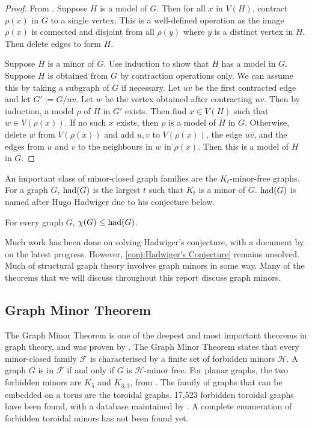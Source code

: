 \begin{proof}
	From \textcite{norinMath599GraphMinors2017}. Suppose \(H\) is a model of \(G\). Then for all \(x\) in \(V(H)\), contract \(\rho(x)\) in \(G\) to a single vertex. This is a well-defined operation as the image $\rho(x)$ is connected and disjoint from all $\rho(y)$ where $y$ is a distinct vertex in $H$. Then delete edges to form \(H\).

	Suppose $H$ is a minor of $G$. Use induction to show that \(H\) has a model in \(G\). Suppose \(H\) is obtained from \(G\) by contraction operations only. We can assume this by taking a subgraph of \(G\) if necessary. Let \(uv\) be the first contracted edge and let \(G' := G / uv\). Let \(w\) be the vertex obtained after contracting \(uv\). Then by induction, a model \(\rho\) of \(H\) in \(G'\) exists. Then find $x \in V(H)$ such that $w \in V(\rho(x))$. If no such $x$ exists, then $\rho$ is a model of $H$ in $G$. Otherwise, delete \(w\) from \(V(\rho(x)) \) and add $u, v$ to $V(\rho(x))$, the edge $uv$, and the edges from $u$ and $v$ to the neighbours in $w$ in $\rho(x)$. Then this is a model of \(H\) in \(G\). 
\end{proof}

An important class of minor-closed graph families are the \(K_t\)-minor-free graphs. For a graph \(G\), \(\operatorname{had}(G)\) is the largest \(t\) such that \(K_t\) is a minor of \(G\). $\operatorname{had}(G)$ is named after Hugo Hadwiger due to his conjecture below.
\begin{conjecture}\label{conj:Hadwiger's Conjecture}
	For every graph \(G\), \(\chi(G) \leq \operatorname{had}(G)\).
\end{conjecture}
Much work has been done on solving Hadwiger's conjecture, with a document by \textcite{seymourHadwigersConjecture2016} on the latest progress. However, \cref{conj:Hadwiger's Conjecture} remains unsolved. Much of structural graph theory involves graph minors in some way. Many of the theorems that we will discuss throughout this report discuss graph minors. 

 \subsection{Graph Minor Theorem}
The Graph Minor Theorem is one of the deepest and most important theorems in graph theory, and was proven by \textcite{robertsonGraphMinorsXX2004}. The Graph Minor Theorem states that every minor-closed family $\mathcal{F}$ is characterised by a finite set of forbidden minors $\mathcal{H}$. A graph $G$ is in $\mathcal{F}$ if and only if $G$ is $\mathcal{H}$-minor free.
For planar graphs, the two forbidden minors are \(K_5\) and \(K_{3,3}\), from \textcite{wagnerUeberEigenschaftEbenen1937}. 
The family of graphs that can be embedded on a torus are the toroidal graphs.  17,523 forbidden toroidal graphs have been found, with a database maintained by \textcite{myrvoldLargeSetTorus2018}. A complete enumeration of forbidden toroidal minors has not been found yet.

